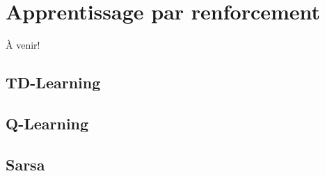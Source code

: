 \newpage
\chapter{Apprentissage par renforcement}


À venir!

\section{TD-Learning}

\section{Q-Learning}

\section{Sarsa}
